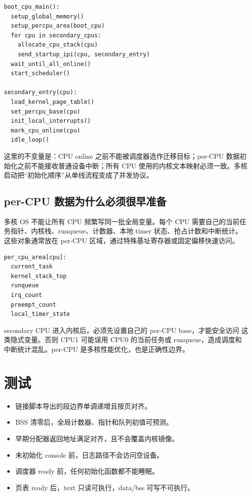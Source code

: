 \begin{lstlisting}
boot_cpu_main():
  setup_global_memory()
  setup_percpu_area(boot_cpu)
  for cpu in secondary_cpus:
    allocate_cpu_stack(cpu)
    send_startup_ipi(cpu, secondary_entry)
  wait_until_all_online()
  start_scheduler()

secondary_entry(cpu):
  load_kernel_page_table()
  set_percpu_base(cpu)
  init_local_interrupts()
  mark_cpu_online(cpu)
  idle_loop()
\end{lstlisting}

这里的不变量是：CPU online 之前不能被调度器选作迁移目标；per-CPU 数据初始化之前不能接收普通设备中断；所有 CPU 使用的内核文本映射必须一致。多核启动把“初始化顺序”从单线流程变成了并发协议。

\subsection{per-CPU 数据为什么必须很早准备}

多核 OS 不能让所有 CPU 频繁写同一批全局变量。每个 CPU 需要自己的当前任务指针、内核栈、runqueue、计数器、本地 timer 状态、抢占计数和中断统计。这些对象通常放在 per-CPU 区域，通过特殊基址寄存器或固定偏移快速访问。

\begin{lstlisting}
per_cpu_area[cpu]:
  current_task
  kernel_stack_top
  runqueue
  irq_count
  preempt_count
  local_timer_state
\end{lstlisting}

secondary CPU 进入内核后，必须先设置自己的 per-CPU base，才能安全访问  这类隐式变量。否则 CPU1 可能误用 CPU0 的当前任务或 runqueue，造成调度和中断统计混乱。per-CPU 是多核性能优化，也是正确性边界。

\section{测试}

\begin{itemize}
\tightlist
\item 链接脚本导出的段边界单调递增且按页对齐。
\item BSS 清零后，全局计数器、指针和队列初值可预测。
\item 早期分配器返回地址满足对齐，且不会覆盖内核镜像。
\item 未初始化 console 前，日志路径不会访问空设备。
\item 调度器 ready 前，任何初始化函数都不能睡眠。
\item 页表 ready 后，text 只读可执行，data/bss 可写不可执行。
\end{itemize}

